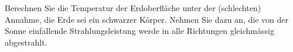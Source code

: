 Berechnen Sie die Temperatur der Erdoberfläche unter der (schlechten) Annahme, die Erde sei ein schwarzer Körper. Nehmen Sie dazu an, die von der Sonne einfallende Strahlungsleistung werde in alle Richtungen gleichmässig abgestrahlt.
